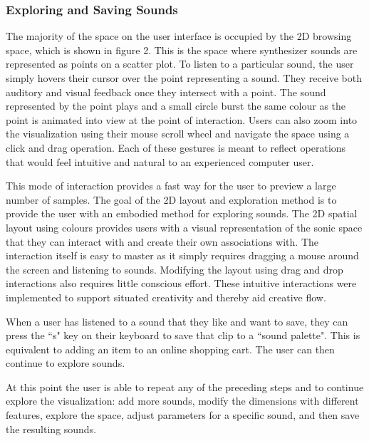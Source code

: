 \subsubsection{Exploring and Saving Sounds}
The majority of the space on the user interface is occupied by the 2D browsing space, which is shown in figure 2. This is the space where synthesizer sounds are represented as points on a scatter plot. To listen to a particular sound, the user simply hovers their cursor over the point representing a sound. They receive both auditory and visual feedback once they intersect with a point. The sound represented by the point plays and a small circle burst the same colour as the point is animated into view at the point of interaction. Users can also zoom into the visualization using their mouse scroll wheel and navigate the space using a click and drag operation. Each of these gestures is meant to reflect operations that would feel intuitive and natural to an experienced computer user.

This mode of interaction provides a fast way for the user to preview a large number of samples. The goal of the 2D layout and exploration method is to provide the user with an embodied method for exploring sounds. The 2D spatial layout using colours provides users with a visual representation of the sonic space that they can interact with and create their own associations with. The interaction itself is easy to master as it simply requires dragging a mouse around the screen and listening to sounds. Modifying the layout using drag and drop interactions also requires little conscious effort. These intuitive interactions were implemented to support situated creativity and thereby aid creative flow.

When a user has listened to a sound that they like and want to save, they can press the ``s" key on their keyboard to save that clip to a ``sound palette". This is equivalent to adding an item to an online shopping cart. The user can then continue to explore sounds.

At this point the user is able to repeat any of the preceding steps and to continue explore the visualization: add more sounds, modify the dimensions with different features, explore the space, adjust parameters for a specific sound, and then save the resulting sounds.

